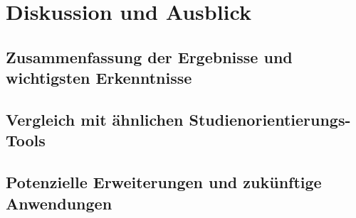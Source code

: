 \section{Diskussion und Ausblick}

\subsection{Zusammenfassung der Ergebnisse und wichtigsten Erkenntnisse}

\subsection{Vergleich mit ähnlichen Studienorientierungs-Tools}

\subsection{Potenzielle Erweiterungen und zukünftige Anwendungen}